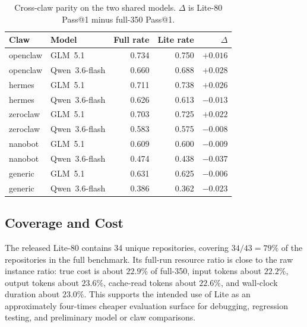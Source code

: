 \begin{table}[h]
\centering
\small
\caption{Cross-claw parity on the two shared models.  $\Delta$ is
Lite-80 Pass@1 minus full-350 Pass@1.}
\label{tab:lite-crossclaw}
\begin{tabular}{llrrr}
\toprule
Claw & Model & Full rate & Lite rate & $\Delta$ \\
\midrule
openclaw & GLM~5.1 & 0.734 & 0.750 & $+0.016$ \\
openclaw & Qwen~3.6-flash & 0.660 & 0.688 & $+0.028$ \\
hermes & GLM~5.1 & 0.711 & 0.738 & $+0.026$ \\
hermes & Qwen~3.6-flash & 0.626 & 0.613 & $-0.013$ \\
zeroclaw & GLM~5.1 & 0.703 & 0.725 & $+0.022$ \\
zeroclaw & Qwen~3.6-flash & 0.583 & 0.575 & $-0.008$ \\
nanobot & GLM~5.1 & 0.609 & 0.600 & $-0.009$ \\
nanobot & Qwen~3.6-flash & 0.474 & 0.438 & $-0.037$ \\
generic & GLM~5.1 & 0.631 & 0.625 & $-0.006$ \\
generic & Qwen~3.6-flash & 0.386 & 0.362 & $-0.023$ \\
\bottomrule
\end{tabular}
\end{table}

\subsection{Coverage and Cost}

The released Lite-80 contains 34 unique repositories, covering
$34/43=79\%$ of the repositories in the full benchmark.  Its full-run
resource ratio is close to the raw instance ratio: true cost is about
$22.9\%$ of full-350, input tokens about $22.2\%$, output tokens about
$23.6\%$, cache-read tokens about $22.6\%$, and wall-clock duration
about $23.0\%$.  This supports the intended use of Lite as an
approximately four-times cheaper evaluation surface for debugging,
regression testing, and preliminary model or claw comparisons.
